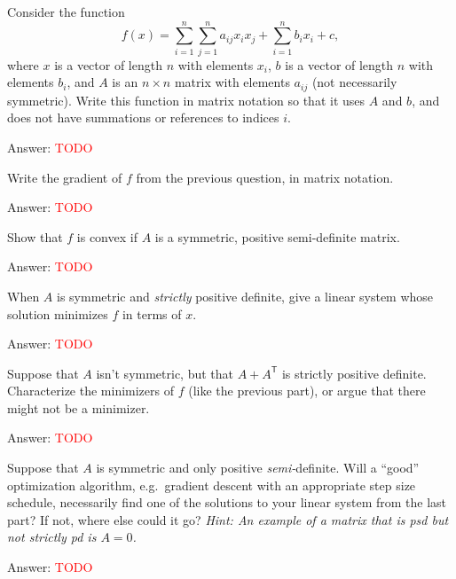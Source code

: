 \documentclass{article}
\newcommand{\ask}[1]{\textcolor{question}{#1}}
\newenvironment{answer}{\par\begingroup\color{answer}Answer: }{\endgroup}
\newcommand{\red}[1]{\textcolor{red}{#1}}
\newcommand{\hint}[1]{\textcolor{black!60!white}{\emph{Hint: #1}}}
\newcommand{\TODO}{\red{TODO}}
\newcommand{\tp}{^\mathsf{T}}
\begin{document}
\begin{qlist}
\item Consider the function
\[
f(x) = \sum_{i=1}^n\sum_{j=1}^n a_{ij}x_ix_j + \sum_{i=1}^n b_ix_i + c,
\]
where $x$ is a vector of length $n$ with elements $x_i$, $b$ is a vector of length $n$ with elements $b_i$, and $A$ is an $n \times n$ matrix with elements $a_{ij}$ (not necessarily symmetric). \ask{Write this function in matrix notation} so that it uses $A$ and $b$, and does not have summations or references to indices $i$.

\begin{answer}\TODO\end{answer}

\item \ask{Write the gradient of $f$ from the previous question, in matrix notation}.
\begin{answer}\TODO\end{answer}

\item \label{q:mat:quad-conv} \ask{Show that $f$ is convex} if $A$ is a symmetric, positive semi-definite matrix.

\begin{answer}\TODO\end{answer}

\item When $A$ is symmetric and \emph{strictly} positive definite, \ask{give a linear system whose solution minimizes $f$ in terms of $x$}.

\begin{answer}\TODO\end{answer}

\item Suppose that $A$ isn't symmetric, but that $A + A\tp$ is strictly positive definite.
\ask{Characterize the minimizers of $f$ (like the previous part), or argue that there might not be a minimizer.}
\begin{answer}\TODO\end{answer}

\item Suppose that $A$ is symmetric and only positive \emph{semi-}definite. \ask{Will a ``good'' optimization algorithm}, e.g.\ gradient descent with an appropriate step size schedule, \ask{necessarily find one of the solutions to your linear system from the last part? If not, where else could it go?}
\hint{An example of a matrix that is psd but not strictly pd is $A = 0$.}

\begin{answer}\TODO\end{answer}


\end{qlist}
\end{document}
